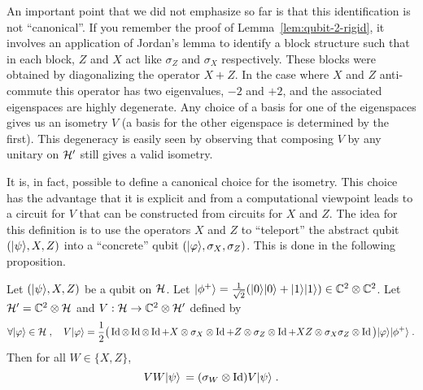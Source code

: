 An important point that we did not emphasize so far is that this identification is not ``canonical''. If you remember the proof of Lemma~\ref{lem:qubit-2-rigid}, it involves an application of Jordan's lemma to identify a block structure such that in each block, $Z$ and $X$ act like $\sigma_Z$ and $\sigma_X$ respectively. These blocks were obtained by diagonalizing the operator $X+Z$. In the case where $X$ and $Z$ anti-commute this operator has two eigenvalues, $-2$ and $+2$, and the associated eigenspaces are highly degenerate. Any choice of a basis for one of the eigenspaces gives us an isometry $V$ (a basis for the other eigenspace is determined by the first). This degeneracy is easily seen by observing that composing $V$ by any unitary on $\mathcal{H}'$ still gives a valid isometry. 

It is, in fact, possible to define a canonical choice for the isometry. This choice has the advantage that it is explicit and from a computational viewpoint leads to a circuit for $V$ that can be constructed from circuits for $X$ and $Z$. The idea for this definition is to use the operators $X$ and $Z$ to ``teleport'' the abstract qubit $(|\psi\rangle,X,Z)$ into a ``concrete'' qubit $(|\varphi\rangle,\sigma_X,\sigma_Z)$. This is done in the following proposition. 

\begin{proposition}
Let $(|\psi\rangle,X,Z)$ be a qubit on $\mathcal{H}$. Let $|\phi^+\rangle = \frac{1}{\sqrt{2}} (|0\rangle|0\rangle + |1\rangle|1\rangle)\in \mathbb{C}^2 \otimes \mathbb{C}^2$. Let $\mathcal{H}'= \mathbb{C}^2 \otimes \mathcal{H}$ and $V: \mathcal{H} \to \mathbb{C}^2 \otimes \mathcal{H}'$ defined by
\begin{equation}\label{eq:explicit-isometry}
 \forall |\varphi\rangle \in \mathcal{H}\;,\quad V|\varphi\rangle = \frac{1}{2}\big(\mathop{\rm Id}\nolimits \otimes \mathop{\rm Id}\nolimits\otimes \mathop{\rm Id}\nolimits + X \otimes \sigma_X \otimes \mathop{\rm Id}\nolimits + Z \otimes \sigma_Z \otimes \mathop{\rm Id}\nolimits + XZ \otimes \sigma_X\sigma_Z \otimes \mathop{\rm Id}\nolimits\big) |\varphi\rangle |\phi^+\rangle\;.
\end{equation}
Then for all $W\in\{X,Z\}$,
\begin{equation}\label{eq:explicit-isometry-2}
VW |\psi\rangle\, = (\sigma_W \otimes \mathop{\rm Id}\nolimits) V |\psi\rangle\;.
\end{equation}
\end{proposition}

